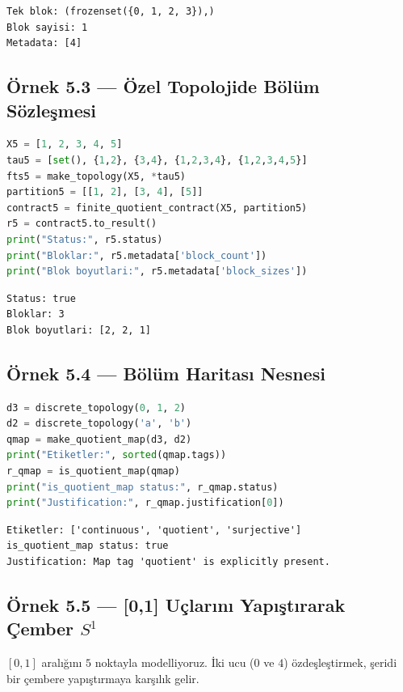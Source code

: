 \begin{verbatim}
Tek blok: (frozenset({0, 1, 2, 3}),)
Blok sayisi: 1
Metadata: [4]
\end{verbatim}

\subsection*{Örnek 5.3 — Özel Topolojide Bölüm Sözleşmesi}

\begin{lstlisting}[language=Python]
X5 = [1, 2, 3, 4, 5]
tau5 = [set(), {1,2}, {3,4}, {1,2,3,4}, {1,2,3,4,5}]
fts5 = make_topology(X5, *tau5)
partition5 = [[1, 2], [3, 4], [5]]
contract5 = finite_quotient_contract(X5, partition5)
r5 = contract5.to_result()
print("Status:", r5.status)
print("Bloklar:", r5.metadata['block_count'])
print("Blok boyutlari:", r5.metadata['block_sizes'])
\end{lstlisting}

\begin{verbatim}
Status: true
Bloklar: 3
Blok boyutlari: [2, 2, 1]
\end{verbatim}

\subsection*{Örnek 5.4 — Bölüm Haritası Nesnesi}

\begin{lstlisting}[language=Python]
d3 = discrete_topology(0, 1, 2)
d2 = discrete_topology('a', 'b')
qmap = make_quotient_map(d3, d2)
print("Etiketler:", sorted(qmap.tags))
r_qmap = is_quotient_map(qmap)
print("is_quotient_map status:", r_qmap.status)
print("Justification:", r_qmap.justification[0])
\end{lstlisting}

\begin{verbatim}
Etiketler: ['continuous', 'quotient', 'surjective']
is_quotient_map status: true
Justification: Map tag 'quotient' is explicitly present.
\end{verbatim}

\subsection*{Örnek 5.5 — [0,1] Uçlarını Yapıştırarak Çember $S^1$}

$[0,1]$ aralığını $5$ noktayla modelliyoruz. İki ucu ($0$ ve $4$)
özdeşleştirmek, şeridi bir çembere yapıştırmaya karşılık gelir.

